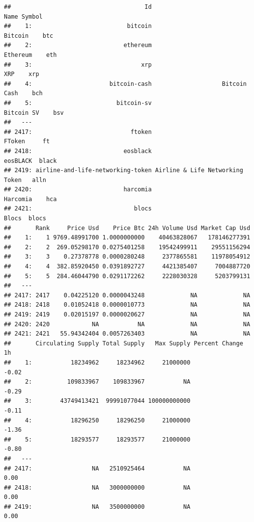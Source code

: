 \documentclass[
]{book}
\begin{document}
\begin{verbatim}
##                                      Id                            Name Symbol
##    1:                           bitcoin                         Bitcoin    btc
##    2:                          ethereum                        Ethereum    eth
##    3:                               xrp                             XRP    xrp
##    4:                      bitcoin-cash                    Bitcoin Cash    bch
##    5:                        bitcoin-sv                      Bitcoin SV    bsv
##   ---                                                                         
## 2417:                            ftoken                          FToken     ft
## 2418:                          eosblack                        eosBLACK  black
## 2419: airline-and-life-networking-token Airline & Life Networking Token   alln
## 2420:                          harcomia                        Harcomia    hca
## 2421:                             blocs                           Blocs  blocs
##       Rank     Price Usd    Price Btc 24h Volume Usd Market Cap Usd
##    1:    1 9769.48991700 1.0000000000    40463828067   178146277391
##    2:    2  269.05298170 0.0275401258    19542499911    29551156294
##    3:    3    0.27378778 0.0000280248     2377865581    11978054912
##    4:    4  382.85920450 0.0391892727     4421385407     7004887720
##    5:    5  284.46044790 0.0291172262     2228030328     5203799131
##   ---                                                              
## 2417: 2417    0.04225120 0.0000043248             NA             NA
## 2418: 2418    0.01052418 0.0000010773             NA             NA
## 2419: 2419    0.02015197 0.0000020627             NA             NA
## 2420: 2420            NA           NA             NA             NA
## 2421: 2421   55.94342404 0.0057263403             NA             NA
##       Circulating Supply Total Supply   Max Supply Percent Change 1h
##    1:           18234962     18234962     21000000             -0.02
##    2:          109833967    109833967           NA             -0.29
##    3:        43749413421  99991077044 100000000000             -0.11
##    4:           18296250     18296250     21000000             -1.36
##    5:           18293577     18293577     21000000             -0.80
##   ---                                                               
## 2417:                 NA   2510925464           NA              0.00
## 2418:                 NA   3000000000           NA              0.00
## 2419:                 NA   3500000000           NA              0.00

\end{verbatim}
\end{document}
